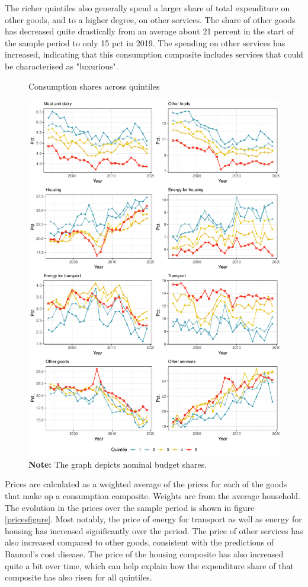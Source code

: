 The richer quintiles also generally spend a larger share of total expenditure on other goods, and to a higher degree, on other services. The share of other goods has decreased quite drastically from an average about 21 percent in the start of the sample period to only 15 pct in 2019. The spending on other services has increased, indicating that this consumption composite includes services that could be characterised as "luxurious". 
\begin{figure}[H]
\centering
\caption{Consumption shares across quintiles }
\label{figshare}
\includegraphics[width=.8\textwidth]{Figures/shareplot_quintiles.pdf}
\captionsetup{singlelinecheck=off,size=scriptsize}
\setlength{\captionmargin}{10pt}
\caption*{
\textbf{Note:} The graph depicts nominal budget shares.}
\end{figure}

Prices are calculated as a weighted average of the prices for each of the goods that make op a consumption composite. Weights are from the average household. The evolution in the prices over the sample period is shown in figure \ref{pricesfigure}. Most notably, the price of energy for transport as well as energy for housing has increased significantly over the period. The price of other services has also increased compared to other goods, consistent with the predictions of Baumol's cost disease. The price of the housing composite has also increased quite a bit over time, which can help explain how the expenditure share of that composite has also risen for all quintiles. 

